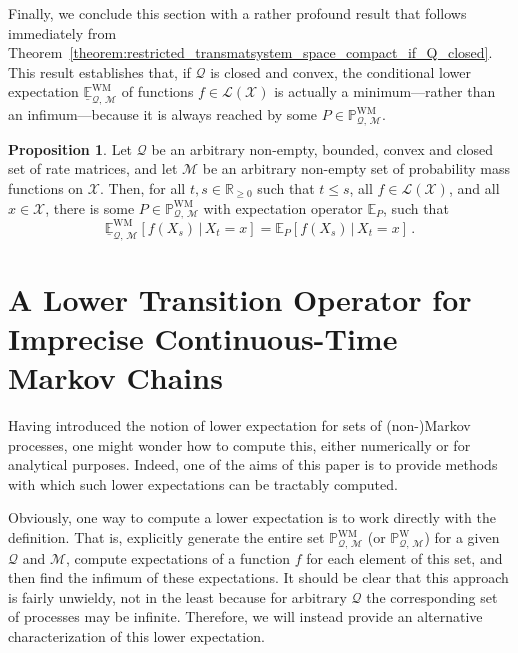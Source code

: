 \documentclass[10pt,a4paper]{paper}
\theoremstyle{definition}
\newtheorem{proposition}[theorem]{Proposition}
\newcommand{\reals}{\mathbb{R}}
\newcommand{\realsnonneg}{\reals_{\geq 0}}
\newcommand{\states}{\mathcal{X}}
\newcommand{\processes}{\mathbb{P}}
\newcommand{\wprocesses}{\processes^{\mathrm{W}}}
\newcommand{\wmprocesses}{\processes^{\mathrm{WM}}}
\newcommand{\gambles}{\mathcal{L}}
\newcommand{\gamblesX}{\gambles(\states)}
\newcommand{\rateset}{\mathcal{Q}}
\begin{document}
Finally, we conclude this section with a rather profound result that follows immediately from Theorem~\ref{theorem:restricted_transmatsystem_space_compact_if_Q_closed}. This result establishes that, if $\rateset$ is closed and convex, the conditional lower expectation $\underline{\mathbb{E}}_{\rateset,\,\mathcal{M}}^{\mathrm{WM}}$ of functions $f\in\gamblesX$ is actually a minimum---rather than an infimum---because it is always reached by some $P\in\wmprocesses_{\rateset,\,\mathcal{M}}$.
\begin{proposition}\label{prop:lower_expectation_reached_if_Q_closed}
Let $\rateset$ be an arbitrary non-empty, bounded, convex and closed set of rate matrices, and let $\mathcal{M}$ be an arbitrary non-empty set of probability mass functions on $\states$. Then, for all $t,s\in\realsnonneg$ such that $t\leq s$, all $f\in\gamblesX$, and all $x\in\states$, there is some $P\in\wmprocesses_{\rateset,\,\mathcal{M}}$ with expectation operator $\mathbb{E}_P$, such that
\begin{equation*}
\underline{\mathbb{E}}^{\mathrm{WM}}_{\rateset,\,\mathcal{M}}[f(X_s)\,\vert\,X_t=x] = \mathbb{E}_P[f(X_s)\,\vert\,X_t=x]\,.
\end{equation*}
\end{proposition}

\section{A Lower Transition Operator for Imprecise Continuous-Time Markov Chains}
\label{sec:lowertrans}

Having introduced the notion of lower expectation for sets of (non-)Markov processes, one might wonder how to compute this, either numerically or for analytical purposes. Indeed, one of the aims of this paper is to provide methods with which such lower expectations can be tractably computed.

Obviously, one way to compute a lower expectation is to work directly with the definition. That is, explicitly generate the entire set $\wmprocesses_{\rateset,\,\mathcal{M}}$ (or $\wprocesses_{\rateset,\,\mathcal{M}}$) for a given $\rateset$ and $\mathcal{M}$, compute expectations of a function $f$ for each element of this set, and then find the infimum of these expectations. It should be clear that this approach is fairly unwieldy, not in the least because for arbitrary $\rateset$ the corresponding set of processes may be infinite. Therefore, we will instead provide an alternative characterization of this lower expectation.
\end{document}
